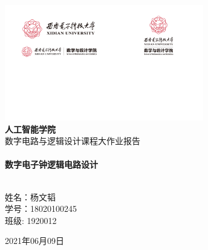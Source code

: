 \begin{titlepage}

\begin{center}


\includegraphics[width=0.65\textwidth]{figure/logo_xdred}\\[1cm]    

\textsc{\LARGE \bfseries 人工智能学院}\\[1.5cm]

\textsc{\Large 数字电路与逻辑设计课程大作业报告}\\[0.5cm]


\HRule \\[0.4cm]
{ \huge \bfseries 数字电子钟逻辑电路设计}\\[0.4cm]

\HRule \\[1.5cm]

\begin{minipage}{0.4\textwidth}
\begin{center} \large
\textsc {\kaishu 姓名：杨文韬\\学号：18020100245\\班级: 1920012}
\end{center}
\end{minipage}

\vfill

{\large 2021年06月09日}

\end{center}

\end{titlepage}
